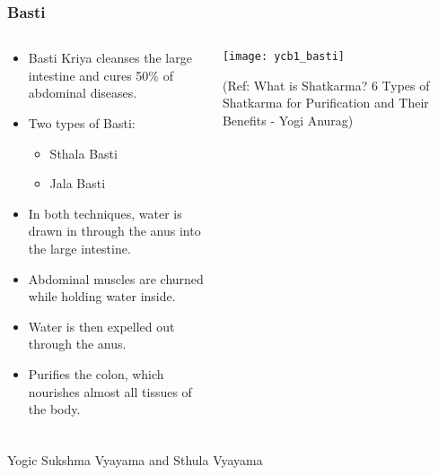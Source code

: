 \begin{frame}[fragile]\frametitle{Basti}
\begin{columns}
    \begin{column}[T]{0.5\linewidth}
      \begin{itemize}
          \item Basti Kriya cleanses the large intestine and cures 50\% of abdominal diseases.
          \item Two types of Basti:
            \begin{itemize}
              \item Sthala Basti
              \item Jala Basti
            \end{itemize}
          \item In both techniques, water is drawn in through the anus into the large intestine.
          \item Abdominal muscles are churned while holding water inside.
          \item Water is then expelled out through the anus.
          \item Purifies the colon, which nourishes almost all tissues of the body.
      \end{itemize}
    \end{column}
    \begin{column}[T]{0.5\linewidth}
        \begin{center}
        \texttt{[image: ycb1\_basti]}
		
		{\tiny (Ref: What is Shatkarma? 6 Types of Shatkarma for Purification and Their Benefits - Yogi Anurag)}	
        \end{center}	
    \end{column}
\end{columns}	  
\end{frame}

\begin{frame}[fragile]\frametitle{}
\begin{center}
{\Large Yogic Sukshma  Vyayama and Sthula Vyayama}
\end{center}
\end{frame}

